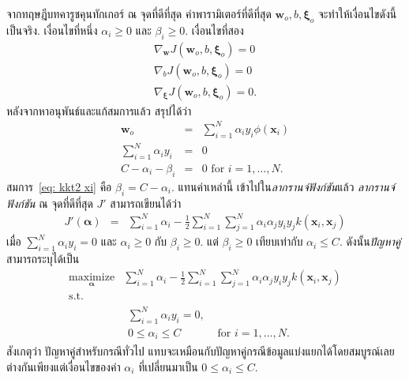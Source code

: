 จากทฤษฎีบทคารูชคุนทักเกอร์
ณ จุดที่ดีที่สุด
ค่าพารามิเตอร์ที่ดีที่สุด $\bm{w}_o, b, \bm{\xi}_o$ จะทำให้เงื่อนไขดังนี้เป็นจริง.
เงื่อนไขที่หนึ่ง $\alpha_i \geq 0$ และ $\beta_i \geq 0$.
เงื่อนไขที่สอง
\begin{eqnarray}
\nabla_{\bm{w}} J (\bm{w}_o, b, \bm{\xi}_o) = 0
\nonumber \\
\nabla_{b} J (\bm{w}_o, b, \bm{\xi}_o) = 0
\nonumber \\
\nabla_{\bm{\xi}} J (\bm{w}_o, b, \bm{\xi}_o) = 0
\nonumber .
\end{eqnarray}
หลังจากหาอนุพันธ์และแก้สมการแล้ว 
สรุปได้ว่า
\begin{eqnarray}
\bm{w}_o &=& \sum_{i=1}^N \alpha_i y_i \phi(\bm{x}_i) 
\label{eq: kkt2 w} \\
\sum_{i=1}^N \alpha_i y_i &=& 0 
\label{eq: kkt2 b} \\
C - \alpha_i - \beta_i &=& 0 \mbox{ for } i =1, \ldots, N
\label{eq: kkt2 xi}.
\end{eqnarray}
สมการ~\ref{eq: kkt2 xi} 
คือ $\beta_i = C - \alpha_i$.
แทนค่าเหล่านี้ เข้าไปใน\textit{ลากรานจ์ฟังก์ชัน}แล้ว
\textit{ลากรานจ์ฟังก์ชัน} ณ จุดที่ดีที่สุด $J'$ สามารถเขียนได้ว่า
\begin{eqnarray}
J'(\bm{\alpha}) &=& \sum_{i=1}^N \alpha_i 
-\frac{1}{2} \sum_{i=1}^N \sum_{j=1}^N \alpha_i \alpha_j y_i y_j k(\bm{x}_i, \bm{x}_j)
\label{eq: csvm J'}
\end{eqnarray}
เมื่อ
$\sum_{i=1}^N \alpha_i y_i = 0$
และ
$\alpha_i \geq 0$
กับ $\beta_i \geq 0$.
แต่ $\beta_i \geq 0$ เทียบเท่ากับ $\alpha_i \leq C$.
ดังนั้น\textit{ปัญหาคู่}สามารถระบุได้เป็น
\begin{eqnarray}
\underset{\bm{\alpha}}{\mathrm{maximize}} &  \sum_{i=1}^N \alpha_i 
- \frac{1}{2}\sum_{i=1}^N \sum_{j=1}^N \alpha_i \alpha_j y_i y_j k(\bm{x}_i, \bm{x}_j) 
\nonumber \\
\mbox{s.t.} & 
\nonumber \\
&
\begin{array}{ll}
\sum_{i=1}^N \alpha_i y_i = 0, &  \\
0 \leq \alpha_i \leq C & \mbox{ for } i =1, \ldots, N.
\end{array}
\label{eq: svm dual}
\end{eqnarray}
สังเกตุว่า
ปัญหาคู่สำหรับกรณีทั่วไป แทบจะเหมือนกับปัญหาคู่กรณีข้อมูลแบ่งแยกได้โดยสมบูรณ์เลย
ต่างกันเพียงแต่เงื่อนไขของค่า $\alpha_i$ 
ที่เปลี่ยนมาเป็น $0 \leq \alpha_i \leq C$.


